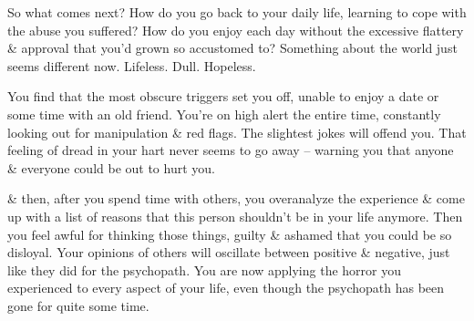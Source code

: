 \documentclass{article}
\numberwithin{equation}{section}
\begin{document}
So what comes next? How do you go back to your daily life, learning to cope with the abuse you suffered? How do you enjoy each day without the excessive flattery \& approval that you'd grown so accustomed to? Something about the world just seems different now. Lifeless. Dull. Hopeless.

You find that the most obscure triggers set you off, unable to enjoy a date or some time with an old friend. You're on high alert the entire time, constantly looking out for manipulation \& red flags. The slightest jokes will offend you. That feeling of dread in your hart never seems to go away -- warning you that anyone \& everyone could be out to hurt you.

\& then, after you spend time with others, you overanalyze the experience \& come up with a list of reasons that this person shouldn't be in your life anymore. Then you feel awful for thinking those things, guilty \& ashamed that you could be so disloyal. Your opinions of others will oscillate between positive \& negative, just like they did for the psychopath. You are now applying the horror you experienced to every aspect of your life, even though the psychopath has been gone for quite some time.
\end{document}
